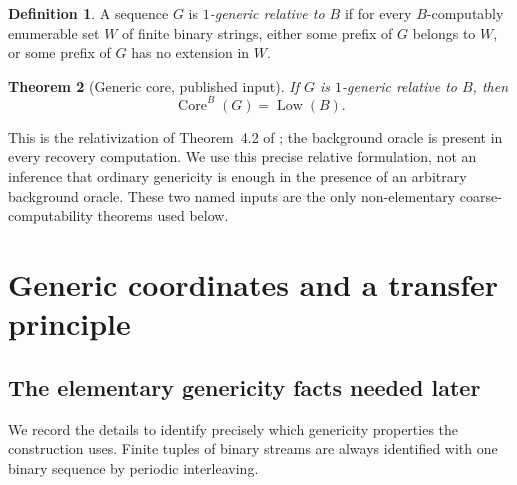 \documentclass[11pt,letterpaper]{article}
\theoremstyle{plain}
\newtheorem{theorem}{Theorem}[section]
\theoremstyle{definition}
\newtheorem{definition}[theorem]{Definition}
\theoremstyle{remark}
\numberwithin{equation}{section}
\newcommand{\Core}{\operatorname{Core}}
\newcommand{\Low}{\operatorname{Low}}
\begin{document}
\begin{definition}\label{cr11:def:relgeneric}
A sequence $G$ is \emph{$1$-generic relative to $B$} if for every
$B$-computably enumerable set $W$ of finite binary strings, either some
prefix of $G$ belongs to $W$, or some prefix of $G$ has no extension in $W$.
\end{definition}

\begin{theorem}[Generic core, published input]\label{cr11:thm:genericcore}
If $G$ is $1$-generic relative to $B$, then
\begin{equation}\label{cr11:eq:genericcore}
                     \Core^B(G)=\Low(B).
\end{equation}
\end{theorem}

This is the relativization of Theorem~4.2 of \cite{HJKS}; the background
oracle is present in every recovery computation. We use this precise
relative formulation, not an inference that ordinary genericity is enough
in the presence of an arbitrary background oracle. These two named inputs
are the only non-elementary coarse-computability theorems used below.

\section{Generic coordinates and a transfer principle}\label{cr11:sec:generic}

\subsection{The elementary genericity facts needed later}

We record the details to identify precisely which genericity properties the
construction uses. Finite tuples of binary streams are always identified
with one binary sequence by periodic interleaving.
\end{document}
